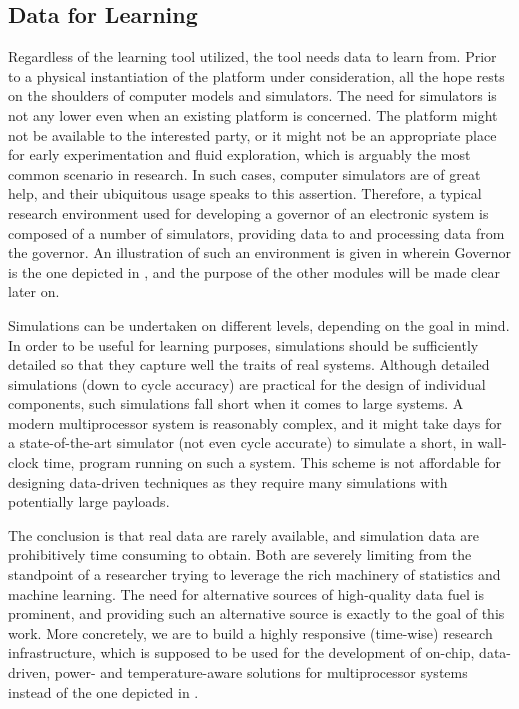 \subsection{Data for Learning} 

Regardless of the learning tool utilized, the tool needs data to learn from.
Prior to a physical instantiation of the platform under consideration, all the
hope rests on the shoulders of computer models and simulators. The need for
simulators is not any lower even when an existing platform is concerned. The
platform might not be available to the interested party, or it might not be an
appropriate place for early experimentation and fluid exploration, which is
arguably the most common scenario in research. In such cases, computer
simulators are of great help, and their ubiquitous usage speaks to this
assertion. Therefore, a typical research environment used for developing a
governor of an electronic system is composed of a number of simulators,
providing data to and processing data from the governor. An illustration of such
an environment is given in  wherein Governor is the one
depicted in , and the purpose of the other modules will be made
clear later on.

Simulations can be undertaken on different levels, depending on the goal in
mind. In order to be useful for learning purposes, simulations should be
sufficiently detailed so that they capture well the traits of real systems.
Although detailed simulations (down to cycle accuracy) are practical for the
design of individual components, such simulations fall short when it comes to
large systems. A modern multiprocessor system is reasonably complex, and it
might take days for a state-of-the-art simulator (not even cycle accurate) to
simulate a short, in wall-clock time, program running on such a system. This
scheme is not affordable for designing data-driven techniques as they require
many simulations with potentially large payloads.

The conclusion is that real data are rarely available, and simulation data are
prohibitively time consuming to obtain. Both are severely limiting from the
standpoint of a researcher trying to leverage the rich machinery of statistics
and machine learning. The need for alternative sources of high-quality data fuel
is prominent, and providing such an alternative source is exactly to the goal of
this work. More concretely, we are to build a highly responsive (time-wise)
research infrastructure, which is supposed to be used for the development of
on-chip, data-driven, power- and temperature-aware solutions for multiprocessor
systems instead of the one depicted in .
